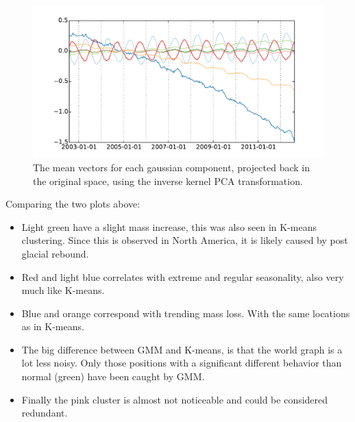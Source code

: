 \begin{figure}[H]
	\center
	\includegraphics[width=\textwidth]{figures/gmm-centroids}
	\caption{The mean vectors for each gaussian component, projected back in the original space, using the inverse kernel PCA transformation.}
\end{figure}

Comparing the two plots above:
\begin{itemize}
	\item Light green have a slight mass increase, this was also seen in K-means clustering. Since this is observed in North America, it is likely caused by post glacial rebound.
	\item  Red and light blue correlates with extreme and regular seasonality, also very much like K-means.
	\item Blue and orange correspond with trending mass loss. With the same locations as in K-means.
	\item The big difference between GMM and K-means, is that the world graph is a lot less noisy. Only those positions with a significant different behavior than normal (green) have been caught by GMM.
	\item Finally the pink cluster is almost not noticeable and could be considered redundant. 
\end{itemize}
